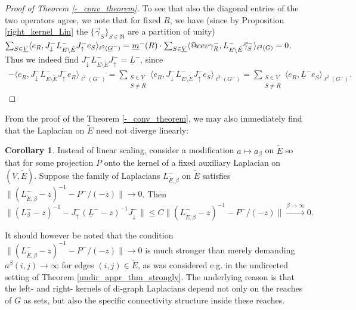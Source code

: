 \documentclass[reqno,12pt,letterpaper]{amsart}
\makeatletter
\numberwithin{equation}{section}
\newcommand{\Lin}{L^{-}}
\DeclareRobustCommand{\cev}[1]{%
	\mathpalette\do@cev{#1}%
}
\newcommand{\do@cev}[2]{%
	\fix@cev{#1}{+}%
	\reflectbox{$\m@th#1\vec{\reflectbox{$\fix@cev{#1}{-}\m@th#1#2\fix@cev{#1}{+}$}}$}%
	\fix@cev{#1}{-}%
}
\newcommand{\fix@cev}[2]{%
	\ifx#1\displaystyle
	\mkern#23mu
	\else
	\ifx#1\textstyle
	\mkern#23mu
	\else
	\ifx#1\scriptstyle
	\mkern#22mu
	\else
	\mkern#22mu
	\fi
	\fi
	\fi
}
\newcommand{\1}{\mathds{1}}
\theoremstyle{definition}
\newtheorem{Cor}[Th]{Corollary}
\makeatother
\begin{document}
\begin{proof}[Proof of Theorem \ref{-_conv_theorem}]
	\medskip
	To see that also the diagonal entries of the two operators agree, we note that for fixed $R$, we have (since by Proposition \ref{right_kernel_Lin} the $\{\vec{\gamma}_S\}_{S \in \mathfrak{R}}$ are a  partition of unity) 
	$
		\sum_{S \in \underline{V}} \langle e_R, J^-_{\downarrow} \Lin_{E\setminus \tilde{E}}  J^-_\uparrow e_S\rangle_{\ell^2(\underline{G}^-)} =  \underline{m}^-(R) \cdot \sum_{S \in \underline{V}} \langle\cev{\gamma}^-_R,  \Lin_{E\setminus \tilde{E}} \vec{\gamma}^-_S \rangle_{\ell^2(G)} = 0
$.
	Thus we indeed find $J^-_{\downarrow} \Lin_{E\setminus \tilde{E}}  J^-_\uparrow = \underline{L}^-$, since
	\begin{align}
		-	\langle e_R, J^-_{\downarrow} \Lin_{E \setminus \tilde{E}} J^-_\uparrow e_R \rangle_{\ell^2(\underline{G}^-)}  
		=  \sum_{\substack{ S \in \underline{V} \\ S \neq R}} \langle e_R, J^-_{\downarrow} \Lin_{E \setminus \tilde{E}} J^-_\uparrow e_S \rangle_{\ell^2(\underline{G}^-)} 
		=  \sum_{\substack{ S \in \underline{V} \\ S \neq R}} \langle e_R, \underline{L}^- e_S \rangle_{\ell^2(\underline{G}^-)}.
	\end{align}
\end{proof}

From the proof of the Theorem \ref{-_conv_theorem}, we may also immediately find that 
the Laplacian on $\tilde{E}$ need not diverge linearly:

\begin{Cor}
	Instead of linear scaling, consider a modification $a \mapsto a_\beta$ on $\tilde{E}$ so that for some projection $P$ onto the kernel of a fixed auxiliary Laplacian on $(V,\tilde{E})$. Suppose  the family of Laplacians $\Lin_{\tilde{E}, \beta}$ on $\tilde{E}$ satisfies $\| (\Lin_{\tilde{E},\beta} -z)^{-1} - P^-/(-z)\| \rightarrow 0$. Then
	$
	\| (\Lin_\beta - z)^{-1} - J^-_{\uparrow} (\underline{L}^- -z)^{-1}  J^-_\downarrow \|\leq C \| (\Lin_{\tilde{E},\beta} -z)^{-1} - P^-/(-z)\| \xrightarrow{\beta \rightarrow \infty} 0.
	$
\end{Cor}
It should however be noted that the condition $\| (\Lin_{\tilde{E},\beta} -z)^{-1} - P^-/(-z)\| \rightarrow 0$ is much stronger than merely demanding $a^\beta(i,j) \rightarrow \infty$ for edges $(i,j) \in \tilde{E}$, as was considered e.g. in the undirected setting of Theorem \ref{undir_appr_thm_strongly}. The underlying reason is that  the left- and right- kernels of di-graph Laplacians depend not only on the reaches of $G$ as sets, but also the specific connectivity structure inside these reaches.
\end{document}
